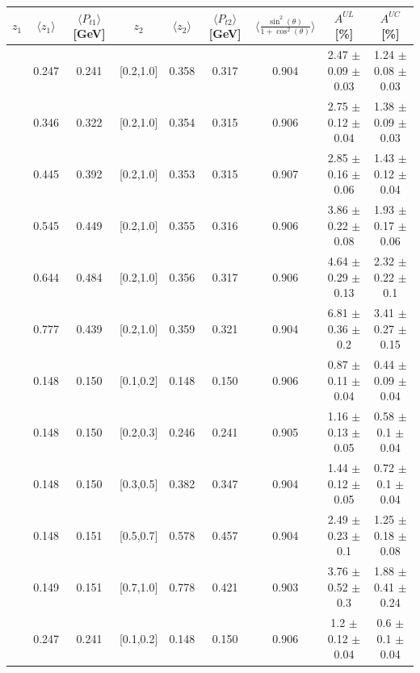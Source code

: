\begin{table}[H]\tiny
\centering
\begin{tabular}{|c|c|c|c|c|c|c|c|c|}
\hline
$z_1$ & $\langle  z_1 \rangle$ & $\langle  P_{t1}  \rangle$ [GeV] & $z_2$ &  $\langle  z_2 \rangle$ & $\langle  P_{t2}\rangle$  [GeV] &$\langle\frac{\sin^2(\theta)}{1+\cos^2(\theta)}\rangle$ & $A^{UL}$ [\%] &  $A^{UC}$ [\%]   \\ \hline
[0.2,0.3]	&	0.247	&	0.241	&	[0.2,1.0]	&	0.358	&	0.317	&	0.904	&2.47  $\pm$ 0.09  $\pm$ 0.03 &1.24  $\pm$ 0.08  $\pm$ 0.03 \\ \hline
[0.3,0.4]	&	0.346	&	0.322	&	[0.2,1.0]	&	0.354	&	0.315	&	0.906	&2.75  $\pm$ 0.12  $\pm$ 0.04 &1.38  $\pm$ 0.09  $\pm$ 0.03 \\ \hline
[0.4,0.5]	&	0.445	&	0.392	&	[0.2,1.0]	&	0.353	&	0.315	&	0.907	&2.85  $\pm$ 0.16  $\pm$ 0.06 &1.43  $\pm$ 0.12  $\pm$ 0.04 \\ \hline
[0.5,0.6]	&	0.545	&	0.449	&	[0.2,1.0]	&	0.355	&	0.316	&	0.906	&3.86  $\pm$ 0.22  $\pm$ 0.08 &1.93  $\pm$ 0.17  $\pm$ 0.06 \\ \hline
[0.6,0.7]	&	0.644	&	0.484	&	[0.2,1.0]	&	0.356	&	0.317	&	0.906	&4.64  $\pm$ 0.29  $\pm$ 0.13 &2.32  $\pm$ 0.22  $\pm$ 0.1  \\ \hline
[0.7,1.0]	&	0.777	&	0.439	&	[0.2,1.0]	&	0.359	&	0.321	&	0.904	&6.81  $\pm$ 0.36  $\pm$ 0.2  &3.41  $\pm$ 0.27  $\pm$ 0.15 \\ \hline
\hline
[0.1,0.2]	&	0.148	&	0.150	&	[0.1,0.2]	&	0.148	&	0.150	&	0.906	&0.87  $\pm$ 0.11  $\pm$ 0.04   &	0.44  $\pm$ 0.09  $\pm$ 0.04  \\ \hline
[0.1,0.2]	&	0.148	&	0.150	&	[0.2,0.3]	&	0.246	&	0.241	&	0.905	&1.16  $\pm$ 0.13  $\pm$ 0.05   &	0.58  $\pm$ 0.1  $\pm$ 0.04   \\ \hline
[0.1,0.2]	&	0.148	&	0.150	&	[0.3,0.5]	&	0.382	&	0.347	&	0.904	&1.44  $\pm$ 0.12  $\pm$ 0.05   &	0.72  $\pm$ 0.1  $\pm$ 0.04   \\ \hline
[0.1,0.2]	&	0.148	&	0.151	&	[0.5,0.7]	&	0.578	&	0.457	&	0.904	&2.49  $\pm$ 0.23  $\pm$ 0.1    &	1.25  $\pm$ 0.18  $\pm$ 0.08  \\ \hline
[0.1,0.2]	&	0.149	&	0.151	&	[0.7,1.0]	&	0.778	&	0.421	&	0.903	&3.76  $\pm$ 0.52  $\pm$ 0.3    &	1.88  $\pm$ 0.41  $\pm$ 0.24  \\ \hline
\hline
[0.2,0.3]	&	0.247	&	0.241	&	[0.1,0.2]	&	0.148	&	0.150	&	0.906	&1.2  $\pm$ 0.12  $\pm$ 0.04    &	0.6  $\pm$ 0.1  $\pm$ 0.04    \\ \hline

\end{tabular}
\end{table}
